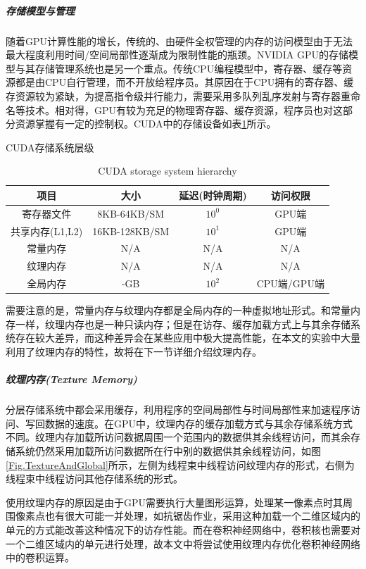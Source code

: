 \subparagraph{存储模型与管理} 
\par 随着GPU计算性能的增长，传统的、由硬件全权管理的内存的访问模型由于无法最大程度利用时间/空间局部性逐渐成为限制性能的瓶颈\cite{HIER}。NVIDIA GPU的存储模型与其存储管理系统也是另一个重点。传统CPU编程模型中，寄存器、缓存等资源都是由CPU自行管理，而不开放给程序员。其原因在于CPU拥有的寄存器、缓存资源较为紧缺，为提高指令级并行能力，需要采用多队列乱序发射与寄存器重命名等技术。相对得，GPU有较为充足的物理寄存器、缓存资源，程序员也对这部分资源掌握有一定的控制权\cite{CUDAPROG}。CUDA中的存储设备如表\ref{table-存储}所示。
\begin{table}
	\centering
	\renewcommand{\thetable}{\arabic{section}-\arabic{table} }
	\renewcommand{\tablename}{表}
	\caption{CUDA存储系统层级}
	\addtocounter{table}{-1}
	\renewcommand{\thetable}{\arabic{section}-\arabic{table} }
	\renewcommand{\tablename}{Table}
	\caption{CUDA storage system hierarchy}
	\begin{tabular}{cccc}
		\toprule
		项目				&	大小			&	延迟(时钟周期)	&	访问权限	\\
		\midrule
		寄存器文件		&	8KB-64KB/SM		&	$ 10^0 $	& GPU端	\\
		共享内存(L1,L2)	&	16KB-128KB/SM	&	$ 10^1 $	&	GPU端\\
		常量内存		&	N/A				&	N/A		&	N/A	\\
		纹理内存		&	N/A				&	N/A		&	N/A \\
		全局内存		&	-GB				&	$ 10^2 $	&	CPU端/GPU端 \\
		\bottomrule
	\end{tabular} \label{table-存储}
\end{table}
\par 需要注意的是，常量内存与纹理内存都是全局内存的一种虚拟地址形式。和常量内存一样，纹理内存也是一种只读内存；但是在访存、缓存加载方式上与其余存储系统存在较大差异，而这种差异会在某些应用中极大提高性能，在本文的实验中大量利用了纹理内存的特性，故将在下一节详细介绍纹理内存。
\subparagraph{纹理内存(Texture Memory)}
\par 分层存储系统中都会采用缓存，利用程序的空间局部性与时间局部性来加速程序访问、写回数据的速度。在GPU中，纹理内存的缓存加载方式与其余存储系统方式不同。纹理内存加载所访问数据周围一个范围内的数据\cite{THEDESIGN}供其余线程访问，而其余存储系统仍然采用加载所访问数据所在行中别的数据供其余线程访问，如图\ref{Fig.TextureAndGlobal}所示，左侧为线程束中线程访问纹理内存的形式，右侧为线程束中线程访问其他存储系统的形式。
\par 使用纹理内存的原因是由于GPU需要执行大量图形运算，处理某一像素点时其周围像素点也有很大可能一并处理，如抗锯齿作业，采用这种加载一个二维区域内的单元的方式能改善这种情况下的访存性能。而在卷积神经网络中，卷积核也需要对一个二维区域内的单元进行处理，故本文中将尝试使用纹理内存优化卷积神经网络中的卷积运算。
